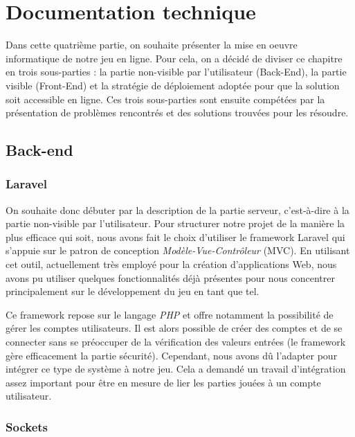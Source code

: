 \documentclass{tnreport}
\begin{document}
\cleardoublepage

\chapter{Documentation technique}

Dans cette quatrième partie, on souhaite présenter la mise en oeuvre informatique de notre jeu en ligne. Pour cela, on a décidé de diviser ce chapitre en trois sous-parties : la partie non-visible par l'utilisateur (Back-End), la partie visible (Front-End) et la stratégie de déploiement adoptée pour que la solution soit accessible en ligne. Ces trois sous-parties sont ensuite compétées par la présentation de problèmes rencontrés et des solutions trouvées pour les résoudre. 

\section{Back-end}

\subsection{Laravel}

On souhaite donc débuter par la description de la partie serveur, c'est-à-dire à la partie non-visible par l'utilisateur. Pour structurer notre projet de la manière la plus efficace qui soit, nous avons fait le choix d'utiliser le framework Laravel qui s'appuie sur le patron de conception \textit{Modèle-Vue-Contrôleur} (MVC). En utilisant cet outil, actuellement très employé pour la création d'applications Web, nous avons pu utiliser quelques fonctionnalités déjà présentes pour nous concentrer principalement sur le développement du jeu en tant que tel. 

Ce framework repose sur le langage \textit{PHP} et offre notamment la possibilité de gérer les comptes utilisateurs. Il est alors possible de créer des comptes et de se connecter sans se préoccuper de la vérification des valeurs entrées (le framework gère efficacement la partie sécurité). Cependant, nous avons dû l'adapter pour intégrer ce type de système à notre jeu. Cela a demandé un travail d'intégration assez important pour être en mesure de lier les parties jouées à un compte utilisateur.

\subsection{Sockets}
\end{document}
